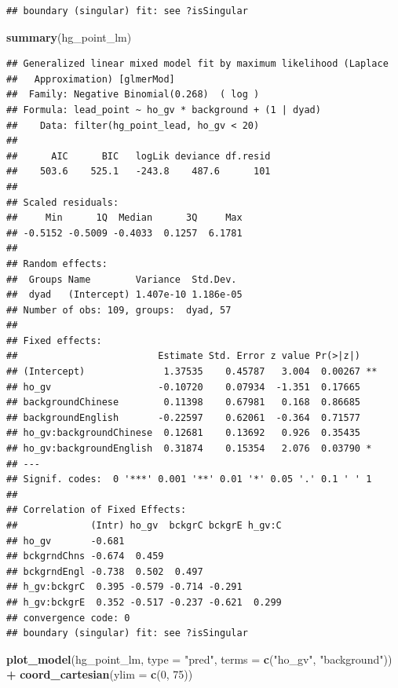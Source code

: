 \documentclass[]{article}
\newenvironment{Shaded}{\begin{snugshade}}{\end{snugshade}}
\newcommand{\DataTypeTok}[1]{\textcolor[rgb]{0.13,0.29,0.53}{#1}}
\newcommand{\DecValTok}[1]{\textcolor[rgb]{0.00,0.00,0.81}{#1}}
\newcommand{\KeywordTok}[1]{\textcolor[rgb]{0.13,0.29,0.53}{\textbf{#1}}}
\newcommand{\NormalTok}[1]{#1}
\newcommand{\OperatorTok}[1]{\textcolor[rgb]{0.81,0.36,0.00}{\textbf{#1}}}
\newcommand{\StringTok}[1]{\textcolor[rgb]{0.31,0.60,0.02}{#1}}
\begin{document}
\begin{verbatim}
## boundary (singular) fit: see ?isSingular
\end{verbatim}

\begin{Shaded}
\begin{Highlighting}[]
\KeywordTok{summary}\NormalTok{(hg_point_lm)}
\end{Highlighting}
\end{Shaded}

\begin{verbatim}
## Generalized linear mixed model fit by maximum likelihood (Laplace
##   Approximation) [glmerMod]
##  Family: Negative Binomial(0.268)  ( log )
## Formula: lead_point ~ ho_gv * background + (1 | dyad)
##    Data: filter(hg_point_lead, ho_gv < 20)
## 
##      AIC      BIC   logLik deviance df.resid 
##    503.6    525.1   -243.8    487.6      101 
## 
## Scaled residuals: 
##     Min      1Q  Median      3Q     Max 
## -0.5152 -0.5009 -0.4033  0.1257  6.1781 
## 
## Random effects:
##  Groups Name        Variance  Std.Dev. 
##  dyad   (Intercept) 1.407e-10 1.186e-05
## Number of obs: 109, groups:  dyad, 57
## 
## Fixed effects:
##                         Estimate Std. Error z value Pr(>|z|)   
## (Intercept)              1.37535    0.45787   3.004  0.00267 **
## ho_gv                   -0.10720    0.07934  -1.351  0.17665   
## backgroundChinese        0.11398    0.67981   0.168  0.86685   
## backgroundEnglish       -0.22597    0.62061  -0.364  0.71577   
## ho_gv:backgroundChinese  0.12681    0.13692   0.926  0.35435   
## ho_gv:backgroundEnglish  0.31874    0.15354   2.076  0.03790 * 
## ---
## Signif. codes:  0 '***' 0.001 '**' 0.01 '*' 0.05 '.' 0.1 ' ' 1
## 
## Correlation of Fixed Effects:
##             (Intr) ho_gv  bckgrC bckgrE h_gv:C
## ho_gv       -0.681                            
## bckgrndChns -0.674  0.459                     
## bckgrndEngl -0.738  0.502  0.497              
## h_gv:bckgrC  0.395 -0.579 -0.714 -0.291       
## h_gv:bckgrE  0.352 -0.517 -0.237 -0.621  0.299
## convergence code: 0
## boundary (singular) fit: see ?isSingular
\end{verbatim}

\begin{Shaded}
\begin{Highlighting}[]
\KeywordTok{plot_model}\NormalTok{(hg_point_lm, }\DataTypeTok{type =} \StringTok{"pred"}\NormalTok{, }\DataTypeTok{terms =} \KeywordTok{c}\NormalTok{(}\StringTok{"ho_gv"}\NormalTok{, }\StringTok{"background"}\NormalTok{)) }\OperatorTok{+}\StringTok{ }\KeywordTok{coord_cartesian}\NormalTok{(}\DataTypeTok{ylim =} \KeywordTok{c}\NormalTok{(}\DecValTok{0}\NormalTok{, }\DecValTok{75}\NormalTok{))}
\end{Highlighting}
\end{Shaded}
\end{document}

